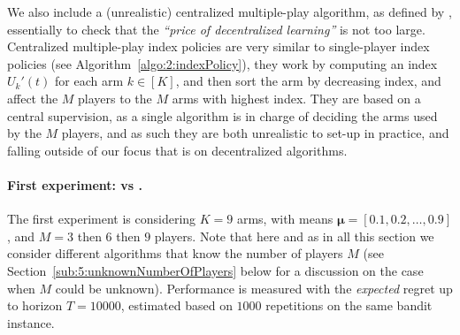 We also include a (unrealistic) centralized multiple-play \klUCB{} algorithm,
as defined by \cite{Anantharam87a},
essentially to check that the \emph{``price of decentralized learning''} is not too large.
Centralized multiple-play index policies are very similar to single-player index policies (see Algorithm~\ref{algo:2:indexPolicy}), they work by computing an index $U_k'(t)$ for each arm $k\in[K]$, and then sort the arm by decreasing index, and affect the $M$ players to the $M$ arms with highest index.
They are based on a central supervision, as a single algorithm is in charge of deciding the arms used by the $M$ players, and as such they are both unrealistic to set-up in practice, and falling outside of our focus that is on decentralized algorithms.


\paragraph{First experiment: \UCB{} vs \klUCB{}.}
%
The first experiment is considering $K=9$ arms, with means $\bm{\mu}=[0.1,0.2,\dots,0.9]$, and $M=3$ then $6$ then $9$ players.
Note that here and as in all this section we consider different algorithms that know the number of players $M$ (see Section~\ref{sub:5:unknownNumberOfPlayers} below for a discussion on the case when $M$ could be unknown).
%
Performance is measured with the \emph{expected} regret up to horizon $T=10000$, estimated based on $1000$ repetitions on the same bandit instance.

